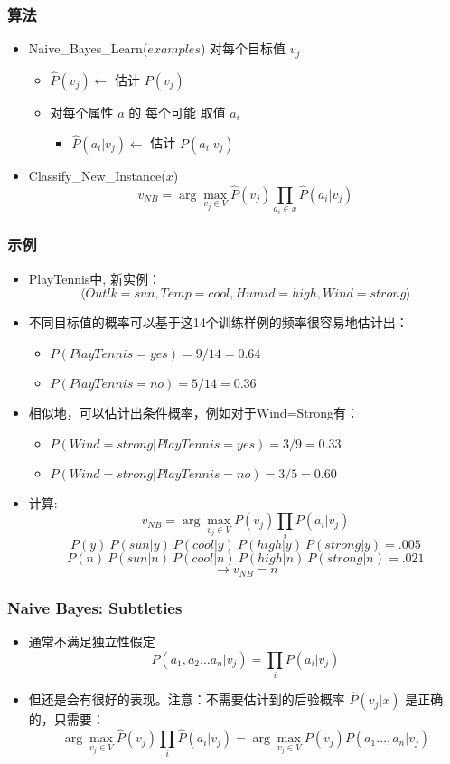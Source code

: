 \documentclass{beamer}
\begin{document}
\begin{frame}
\frametitle{算法}
\label{sec-7-3}


\begin{itemize}
\item Naive\_Bayes\_Learn($examples$)
  对每个目标值 $v_j$
\begin{itemize}
\item $\hat{P}(v_j) \leftarrow$ 估计 $P(v_j)$
\item 对每个属性 $a$ 的 每个可能 取值 $a_i$
\begin{itemize}
\item $\hat{P}(a_i|v_j) \leftarrow$ 估计 $P(a_i|v_j)$
\end{itemize}
\end{itemize}
\item Classify\_New\_Instance($x$)
  $$v_{NB} = \arg \max_{v_{j} \in V} \hat{P}(v_{j}) \prod_{a_i \in x} \hat{P}(a_{i} | v_{j})$$
\end{itemize}
\end{frame}
\begin{frame}
\frametitle{示例}
\label{sec-7-4}


\begin{itemize}
\item PlayTennis中, 新实例： 
  $$\langle Outlk=sun, Temp=cool, Humid=high, Wind=strong \rangle$$
\item 不同目标值的概率可以基于这14个训练样例的频率很容易地估计出：
\begin{itemize}
\item $P(PlayTennis=yes)=9/14=0.64$
\item $P(PlayTennis=no)=5/14=0.36$
\end{itemize}
\item 相似地，可以估计出条件概率，例如对于Wind=Strong有：
\begin{itemize}
\item $P(Wind=strong|PlayTennis=yes)=3/9=0.33$
\item $P(Wind=strong|PlayTennis=no)=3/5=0.60$
\end{itemize}
\item 计算:
    $$v_{NB} = \arg \max_{v_{j} \in V} P(v_{j}) \prod_{i} P(a_{i} | v_{j})$$
    \[P(y)\ P(sun|y)\ P(cool|y)\ P(high|y)\ P(strong|y) = .005 \]
    \[P(n)\ P(sun|n)\ P(cool|n)\ P(high|n)\ P(strong|n) = .021 \]
    \[ \rightarrow v_{NB} = n \]
\end{itemize}
\end{frame}
\begin{frame}
\frametitle{Naive Bayes: Subtleties}
\label{sec-7-5}

\begin{itemize}
\item 通常不满足独立性假定
    $$P(a_{1}, a_{2} \ldots a_{n}|v_{j}) = \prod_{i} P(a_{i} | v_{j})$$
\item 但还是会有很好的表现。注意：不需要估计到的后验概率 $\hat{P}(v_j|x)$ 是正确的，只需要：
    $$\arg\max_{v_{j}\in V}\hat{P}(v_{j})\prod_{i}\hat{P}(a_{i}|v_{j})=\arg\max_{v_{j} \in V}  P(v_{j}) P(a_{1} \ldots, a_n | v_{j})$$
\end{itemize}
\end{frame}
\end{document}
